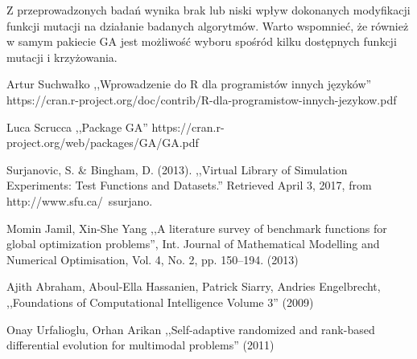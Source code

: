\documentclass[11pt, a4paper]{article}
\newcommand{\fbi}{\leavevmode{\parindent=1em\indent}}
\begin{document}
\fbi
Z przeprowadzonych badań wynika brak lub niski wpływ dokonanych modyfikacji funkcji mutacji na działanie badanych algorytmów. Warto wspomnieć, że również w samym pakiecie GA jest możliwość wyboru spośród kilku dostępnych funkcji mutacji i krzyżowania.

\newpage
\begin{thebibliography}{40}

Artur Suchwałko ,,Wprowadzenie do R dla programistów innych języków'' https://cran.r-project.org/doc/contrib/R-dla-programistow-innych-jezykow.pdf

Luca Scrucca ,,Package GA''
https://cran.r-project.org/web/packages/GA/GA.pdf

Surjanovic, S. \& Bingham, D. (2013). ,,Virtual Library of Simulation Experiments: Test Functions and Datasets.'' Retrieved April 3, 2017, from http://www.sfu.ca/~ssurjano.

Momin Jamil, Xin-She Yang ,,A literature survey of benchmark functions for global optimization problems'', Int. Journal of Mathematical Modelling and Numerical Optimisation, Vol. 4, No. 2, pp. 150–194. (2013)

Ajith Abraham, Aboul-Ella Hassanien, Patrick Siarry, Andries Engelbrecht, ,,Foundations of Computational Intelligence Volume 3'' (2009)

Onay Urfalioglu, Orhan Arikan ,,Self-adaptive randomized and rank-based differential evolution for multimodal problems'' (2011)

\end{thebibliography}
\end{document}
